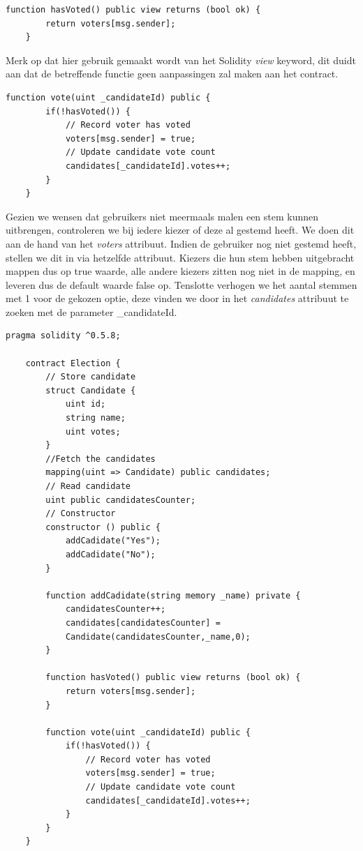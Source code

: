 	\begin{lstlisting}[numbers=none]
	function hasVoted() public view returns (bool ok) {
		return voters[msg.sender];
	}
	\end{lstlisting}
	
	Merk op dat hier gebruik gemaakt wordt van het Solidity \textit{view} keyword, dit duidt aan dat de betreffende functie geen aanpassingen zal maken aan het contract.
	
	\begin{lstlisting}[numbers=none]
	function vote(uint _candidateId) public {
		if(!hasVoted()) {
			// Record voter has voted
			voters[msg.sender] = true;
			// Update candidate vote count
			candidates[_candidateId].votes++;
		}
	}
	\end{lstlisting}
	
	Gezien we wensen dat gebruikers niet meermaals malen een stem kunnen uitbrengen, controleren we bij iedere kiezer of deze al gestemd heeft. We doen dit aan de hand van het \textit{voters} attribuut. Indien de gebruiker nog niet gestemd heeft, stellen we dit in via hetzelfde attribuut. Kiezers die hun stem hebben uitgebracht mappen dus op true waarde, alle andere kiezers zitten nog niet in de mapping, en leveren dus de default waarde false op. Tenslotte verhogen we het aantal stemmen met 1 voor de gekozen optie, deze vinden we door in het \textit{candidates} attribuut te zoeken met de parameter \_candidateId.
	
		\lstset{language=JavaScriptSolidity} 
	\begin{lstlisting}[frame=single] 
	pragma solidity ^0.5.8;
	
	contract Election {
		// Store candidate
		struct Candidate {
			uint id;
			string name;
			uint votes;
		}
		//Fetch the candidates
		mapping(uint => Candidate) public candidates;
		// Read candidate
		uint public candidatesCounter;
		// Constructor
		constructor () public {
			addCadidate("Yes");
			addCadidate("No");
		}
	
		function addCadidate(string memory _name) private {
			candidatesCounter++;
			candidates[candidatesCounter] = 
			Candidate(candidatesCounter,_name,0);
		}
	
		function hasVoted() public view returns (bool ok) {
			return voters[msg.sender];
		}
	
		function vote(uint _candidateId) public {
			if(!hasVoted()) {
				// Record voter has voted
				voters[msg.sender] = true;
				// Update candidate vote count
				candidates[_candidateId].votes++;
			}
		}
	}
	\end{lstlisting}
	
